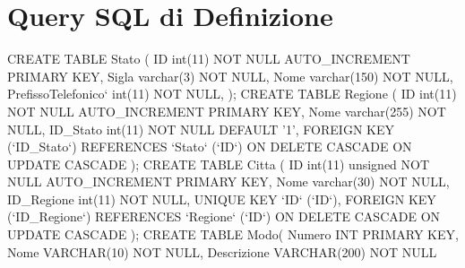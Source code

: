 \section{Query SQL di Definizione}
CREATE TABLE Stato (\newline
\null\qquad ID int(11) NOT NULL AUTO\_INCREMENT PRIMARY KEY,\newline
\null\qquad Sigla varchar(3) NOT NULL,\newline
\null\qquad Nome varchar(150) NOT NULL,\newline
\null\qquad PrefissoTelefonico` int(11) NOT NULL,\newline
);\newline\newline
CREATE TABLE Regione (\newline
\null\qquad ID int(11) NOT NULL AUTO\_INCREMENT PRIMARY KEY,\newline
\null\qquad Nome varchar(255) NOT NULL,\newline
\null\qquad ID\_Stato int(11) NOT NULL DEFAULT '1',\newline
\null\qquad FOREIGN KEY (`ID\_Stato`) REFERENCES `Stato` (`ID`) \newline
\null\qquad ON DELETE CASCADE\newline
\null\qquad ON UPDATE CASCADE\newline
);\newline\newline
CREATE TABLE Citta (\newline
\null\qquad ID int(11) unsigned NOT NULL AUTO\_INCREMENT PRIMARY KEY,\newline
\null\qquad Nome varchar(30) NOT NULL,\newline
\null\qquad ID\_Regione int(11) NOT NULL,\newline
\null\qquad UNIQUE KEY `ID` (`ID`),\newline
\null\qquad FOREIGN KEY (`ID\_Regione`) REFERENCES `Regione` (`ID`) \newline
\null\qquad ON DELETE CASCADE\newline
\null\qquad ON UPDATE CASCADE\newline
);\newline\newline
CREATE TABLE Modo(\newline
\null\qquad Numero INT PRIMARY KEY,\newline
\null\qquad Nome VARCHAR(10) NOT NULL,\newline
\null\qquad Descrizione VARCHAR(200) NOT NULL\newline
